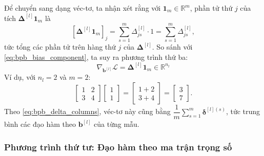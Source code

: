 Để chuyển sang dạng véc-tơ, ta nhận xét rằng với $\mathbf{1}_m \in \mathbb{R}^m$, phần tử thứ $j$ của tích $\boldsymbol{\Delta}^{[l]}\mathbf{1}_m$ là
\begin{equation}
\left[\boldsymbol{\Delta}^{[l]}\mathbf{1}_m\right]_j = \sum_{s=1}^{m}\Delta_{js}^{[l]}\cdot 1 = \sum_{s=1}^{m}\Delta_{js}^{[l]},
\end{equation}
tức tổng các phần tử trên hàng thứ $j$ của $\boldsymbol{\Delta}^{[l]}$. So sánh với \eqref{eq:bpb_bias_component}, ta suy ra phương trình thứ ba:
\begin{equation}
\boxed{
\nabla_{\mathbf{b}^{[l]}}\mathcal{L} = \boldsymbol{\Delta}^{[l]}\mathbf{1}_m \in \mathbb{R}^{n_l}
}
\label{eq:bpb_bias_vector}
\end{equation}
Ví dụ, với $n_l = 2$ và $m = 2$:
\[
\begin{bmatrix}1&2\\3&4\end{bmatrix}\begin{bmatrix}1\\1\end{bmatrix}=\begin{bmatrix}1+2\\3+4\end{bmatrix}=\begin{bmatrix}3\\7\end{bmatrix}.
\]
Theo \eqref{eq:bpb_delta_columns}, véc-tơ này cũng bằng $\dfrac{1}{m}\sum_{s=1}^{m}\boldsymbol{\delta}^{[l](s)}$, tức trung bình các đạo hàm theo $\mathbf{b}^{[l]}$ của từng mẫu.
 
\subsubsection{Phương trình thứ tư: Đạo hàm theo ma trận trọng số}
 
